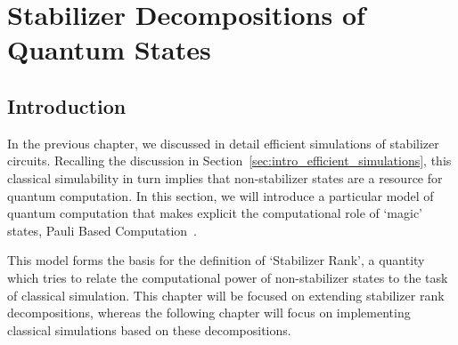 
\chapter{Stabilizer Decompositions of Quantum States}\label{chap:stabrank}
\section{Introduction}\label{sec:srank_intro}
In the previous chapter, we discussed in detail efficient simulations of stabilizer circuits. Recalling the discussion in Section~\ref{sec:intro_efficient_simulations}, this classical simulability in turn implies that non-stabilizer states are a resource for quantum computation. In this section, we will introduce a particular model of quantum computation that makes explicit the computational role of `magic' states, Pauli Based Computation~\cite{Yoganathan2019,Bravyi2015}.\par
This model forms the basis for the definition of `Stabilizer Rank', a quantity which tries to relate the computational power of non-stabilizer states to the task of classical simulation. This chapter will be focused on extending stabilizer rank decompositions, whereas the following chapter will focus on implementing classical simulations based on these decompositions.
